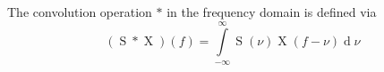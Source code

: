 The convolution operation $*$ in the frequency domain is defined via
$$(\operatorname{S} * \operatorname{X})(f) = \int\limits_{- \infty}^{\infty} \operatorname{S}(\nu) \operatorname{X}(f - \nu) \operatorname{d}\nu$$
